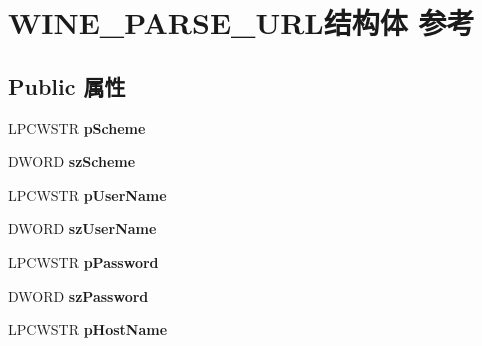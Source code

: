 \hypertarget{struct_w_i_n_e___p_a_r_s_e___u_r_l}{}\section{W\+I\+N\+E\+\_\+\+P\+A\+R\+S\+E\+\_\+\+U\+R\+L结构体 参考}
\label{struct_w_i_n_e___p_a_r_s_e___u_r_l}
\subsection*{Public 属性}
\begin{DoxyCompactItemize}
\item 
\mbox{\label{struct_w_i_n_e___p_a_r_s_e___u_r_l_affebc10cd88102e4050fad5da185e2be}} 
L\+P\+C\+W\+S\+TR {\bfseries p\+Scheme}
\item 
\mbox{\label{struct_w_i_n_e___p_a_r_s_e___u_r_l_a7690142444f2998baecaedc921288f02}} 
D\+W\+O\+RD {\bfseries sz\+Scheme}
\item 
\mbox{\label{struct_w_i_n_e___p_a_r_s_e___u_r_l_a5f8dc38ebe8167f805c2ccba18340920}} 
L\+P\+C\+W\+S\+TR {\bfseries p\+User\+Name}
\item 
\mbox{\label{struct_w_i_n_e___p_a_r_s_e___u_r_l_a69d5702c6c242fc4c0013604f3df59ae}} 
D\+W\+O\+RD {\bfseries sz\+User\+Name}
\item 
\mbox{\label{struct_w_i_n_e___p_a_r_s_e___u_r_l_a722a85ad77bb39f369fc9f47d7d77309}} 
L\+P\+C\+W\+S\+TR {\bfseries p\+Password}
\item 
\mbox{\label{struct_w_i_n_e___p_a_r_s_e___u_r_l_a245de4666914372093b2d09d03a12d8a}} 
D\+W\+O\+RD {\bfseries sz\+Password}
\item 
\mbox{\label{struct_w_i_n_e___p_a_r_s_e___u_r_l_af19ada3c03678d2cbbd1fb7deb069e8b}} 
L\+P\+C\+W\+S\+TR {\bfseries p\+Host\+Name}
\item 
\mbox{\label{struct_w_i_n_e___p_a_r_s_e___u_r_l_a1c267d16c4bc89c93598dd7060462a03}} 

\end{DoxyCompactItemize}
